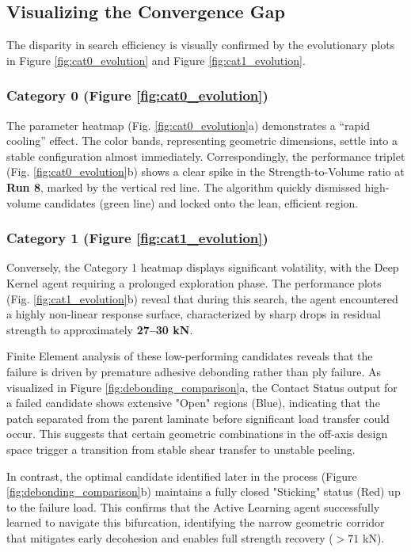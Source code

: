 \documentclass[
  preprint,
  12pt,
  a4paper
]{elsarticle}
\begin{document}
\subsection{Visualizing the Convergence Gap}

The disparity in search efficiency is visually confirmed by the evolutionary plots in Figure \ref{fig:cat0_evolution} and Figure \ref{fig:cat1_evolution}.

\subsubsection{Category 0 (Figure \ref{fig:cat0_evolution})}
The parameter heatmap (Fig. \ref{fig:cat0_evolution}a) demonstrates a ``rapid cooling'' effect. The color bands, representing geometric dimensions, settle into a stable configuration almost immediately. Correspondingly, the performance triplet (Fig. \ref{fig:cat0_evolution}b) shows a clear spike in the Strength-to-Volume ratio at \textbf{Run 8}, marked by the vertical red line. The algorithm quickly dismissed high-volume candidates (green line) and locked onto the lean, efficient region.

\subsubsection{Category 1 (Figure \ref{fig:cat1_evolution})}
Conversely, the Category 1 heatmap displays significant volatility, with the Deep Kernel agent requiring a prolonged exploration phase. The performance plots (Fig. \ref{fig:cat1_evolution}b) reveal that during this search, the agent encountered a highly non-linear response surface, characterized by sharp drops in residual strength to approximately \textbf{27--30 kN}.

Finite Element analysis of these low-performing candidates reveals that the failure is driven by premature adhesive debonding rather than ply failure. As visualized in Figure \ref{fig:debonding_comparison}a, the Contact Status output for a failed candidate shows extensive "Open" regions (Blue), indicating that the patch separated from the parent laminate before significant load transfer could occur. This suggests that certain geometric combinations in the off-axis design space trigger a transition from stable shear transfer to unstable peeling. 

In contrast, the optimal candidate identified later in the process (Figure \ref{fig:debonding_comparison}b) maintains a fully closed "Sticking" status (Red) up to the failure load. This confirms that the Active Learning agent successfully learned to navigate this bifurcation, identifying the narrow geometric corridor that mitigates early decohesion and enables full strength recovery ($>71$ kN).
\end{document}
